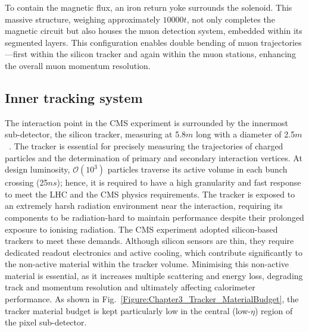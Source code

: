 To contain the magnetic flux, an iron return yoke surrounds the solenoid. This massive structure, weighing approximately $10000\unit{t}$, not only completes the magnetic circuit but also houses the muon detection system, embedded within its segmented layers. This configuration enables double bending of muon trajectories—first within the silicon tracker and again within the muon stations, enhancing the overall muon momentum resolution.

\subsection{Inner tracking system}

The interaction point in the CMS experiment is surrounded by the innermost sub-detector, the silicon tracker, measuring at 5.8$\unit{m}$ long with a diameter of 2.5$\unit{m}$~\cite{LHC_CMS,CMS_Detector_Run3}. The tracker is essential for precisely measuring the trajectories of charged particles and the determination of primary and secondary interaction vertices. At design luminosity, $\mathcal{O}(10^3)$ particles traverse its active volume in each bunch crossing (25$\unit{ns}$); hence, it is required to have a high granularity and fast response to meet the LHC and the CMS physics requirements. The tracker is exposed to an extremely harsh radiation environment near the interaction, requiring its components to be radiation-hard to maintain performance despite their prolonged exposure to ionising radiation. The CMS experiment adopted silicon-based trackers to meet these demands. Although silicon sensors are thin, they require dedicated readout electronics and active cooling, which contribute significantly to the non-active material within the tracker volume. Minimising this non-active material is essential, as it increases multiple scattering and energy loss, degrading track and momentum resolution and ultimately affecting calorimeter performance. As shown in Fig.~\ref{Figure:Chapter3_Tracker_MaterialBudget}, the tracker material budget is kept particularly low in the central (low-$\eta$) region of the pixel sub-detector.

